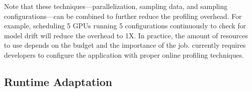 
Note that these techniques---parallelization, sampling data, and sampling
configurations---can be combined to further reduce the profiling overhead. For
example, scheduling 5 GPUs running 5 configurations continuously to check for
model drift will reduce the overhead to 1X\@. In practice, the amount of
resources to use depends on the budget and the importance of the job. \sysname{}
currently requires developers to configure the application with proper online
profiling techniques.


\subsection{Runtime Adaptation}
\label{sec:runtime-adaptation}

